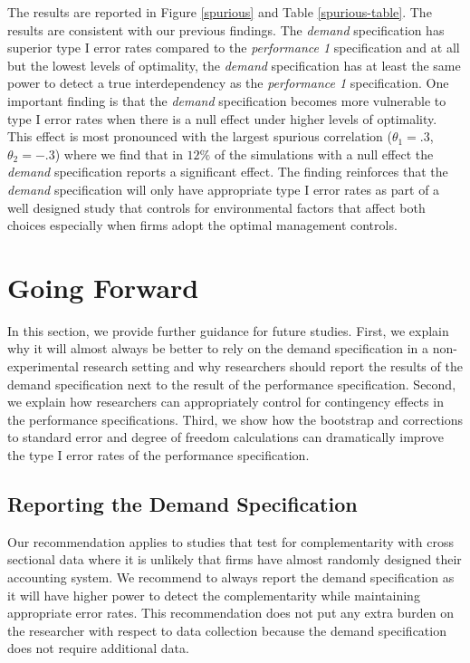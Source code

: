 \documentclass[12pt]{article}
\begin{document}
The results are reported in Figure \ref{spurious} and Table \ref{spurious-table}. The results are consistent with our previous findings. The \emph{demand} specification has superior type I error rates compared to the \emph{performance 1} specification and at all but the lowest levels of optimality, the \emph{demand} specification has at least the same power to detect a true interdependency as the \emph{performance 1} specification. One important finding is that the \emph{demand} specification becomes more vulnerable to type I error rates when there is a null effect under higher levels of optimality. This effect is most pronounced with the largest spurious correlation (\(\theta_1 = .3\), \(\theta_2 = -.3\)) where we find that in $12\%$ of the simulations with a null effect the \emph{demand} specification reports a significant effect. The finding reinforces that the \emph{demand} specification will only have appropriate type I error rates as part of a well designed study that controls for environmental factors that affect both choices especially when firms adopt the optimal management controls.

\section{Going Forward}

In this section, we provide further guidance for future studies. First, we explain why it will almost always be better to rely on the demand specification in a non-experimental research setting and why researchers should report the results of the demand specification next to the result of the performance specification. Second, we explain how researchers can appropriately control for contingency effects in the performance specifications. Third, we show how the bootstrap and corrections to standard error and degree of freedom calculations can dramatically improve the type I error rates of the performance specification.

\subsection{Reporting the Demand Specification}

Our recommendation applies to studies that test for complementarity with cross sectional data where it is unlikely that firms have almost randomly designed their accounting system. We recommend to always report the demand specification as it will have higher power to detect the complementarity while maintaining appropriate error rates. This recommendation does not put any extra burden on the researcher with respect to data collection because the demand specification does not require additional data.
\end{document}
